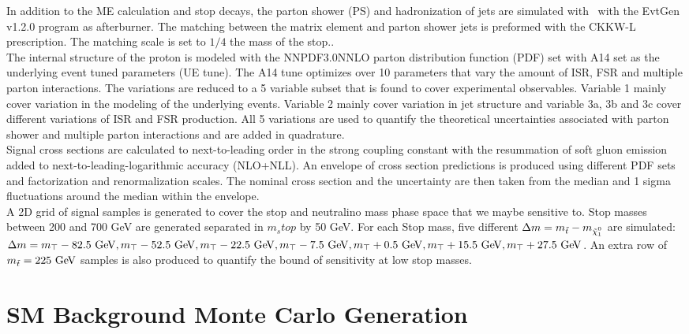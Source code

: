 \indent In addition to the ME calculation and stop decays, the parton shower (PS) and hadronization of jets are simulated with \pythiaeight\ with the {\sc EvtGen} v1.2.0 program as afterburner.  The matching between the matrix element and parton shower jets is preformed with the CKKW-L prescription.   The matching scale is set to $1/4$ the mass of the stop.. \\

\indent The internal structure of the proton is modeled with the NNPDF3.0NNLO parton distribution function (PDF) set with A14 set as the underlying event tuned parameters (UE tune).\cite{NNPDF3.0}  The A14 tune optimizes over 10 parameters that vary the amount of ISR, FSR and multiple parton interactions.  The variations are reduced to a 5 variable subset that is found to cover experimental observables.\cite{Pythia8tunes}  Variable 1 mainly cover variation in the modeling of the underlying events.  Variable 2 mainly cover variation in jet structure and variable 3a, 3b and 3c cover different variations of ISR and FSR production.  All 5 variations are used to quantify the theoretical uncertainties associated with parton shower and multiple parton interactions and are added in quadrature.\\

\indent Signal cross sections are calculated to next-to-leading order in the strong coupling constant with the resummation of soft gluon emission added to next-to-leading-logarithmic accuracy (NLO+NLL).\cite{stopXsec}  An envelope of cross section predictions is produced using different PDF sets and factorization and renormalization scales.  The nominal cross section and the uncertainty are then taken from the median and 1 sigma fluctuations around the median within the envelope.  \\

\indent A 2D grid of signal samples is generated to cover the stop and neutralino mass phase space that we maybe sensitive to.  Stop masses between 200 and 700 GeV are generated separated in $m_stop$ by 50 GeV.  For each Stop mass, five different ${\Delta}m = m_{\stop} - m_{\ninoone}$ are simulated: ${\Delta}m = m_{\top} - 82.5 \gev, m_{\top} - 52.5 \gev, m_{\top} - 22.5 \gev, m_{\top} - 7.5 \gev, m_{\top}+0.5 \gev,  m_{\top}+15.5 \gev, m_{\top}+27.5 \gev$.  An extra row of $m_{\stop} = 225 \gev$ samples is also produced to quantify the bound of sensitivity at low stop masses. \\

\section{SM Background Monte Carlo Generation}
\label{sec:MC:Bkg}

